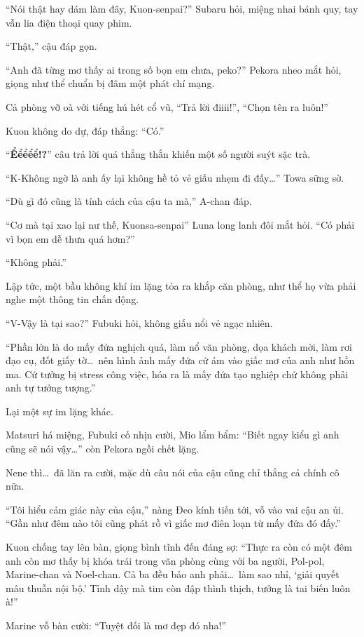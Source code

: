\documentclass[../main.tex]{subfiles}
\begin{document}
``Nói thật hay dám làm đây, Kuon-senpai?'' Subaru hỏi, miệng nhai bánh quy, tay vẫn lia điện thoại quay phim.

``Thật,'' cậu đáp gọn.

``Anh đã từng mơ thấy ai trong số bọn em chưa, peko?'' Pekora nheo mắt hỏi, giọng như thể chuẩn bị đâm một phát chí mạng.

Cả phòng vỡ oà với tiếng hú hét cổ vũ, ``Trả lời điiii!'', ``Chọn tên ra luôn!''

Kuon không do dự, đáp thẳng: ``Có.''

``\textbf{Ểểểểể!?}'' câu trả lời quá thẳng thắn khiến một số người suýt sặc trà.

``K-Không ngờ là anh ấy lại không hề tỏ vẻ giấu nhẹm đi đấy\dots'' Towa sững sờ.

``Dù gì đó cũng là tính cách của cậu ta mà,'' A-chan đáp.

``Cơ mà tại xao lại nư thế, Kuonsa-senpai'' Luna long lanh đôi mắt hỏi. ``Có phải vì bọn em dễ thưn quá hơm?''

``Không phải.''

Lập tức, một bầu không khí im lặng tỏa ra khắp căn phòng, như thể họ vừa phải nghe một thông tin chấn động.

``V-Vậy là tại sao?'' Fubuki hỏi, không giấu nổi vẻ ngạc nhiên.

``Phần lớn là do mấy đứa nghịch quá, làm nổ văn phòng, dọa khách mời, làm rơi đạo cụ, đốt giấy tờ\dots\ nên hình ảnh mấy đứa cứ ám vào giấc mơ của anh như hồn ma. Cứ tưởng bị stress công việc, hóa ra là mấy đứa tạo nghiệp chứ không phải anh tự tưởng tượng.''

Lại một sự im lặng khác.

Matsuri há miệng, Fubuki cố nhịn cười, Mio lẩm bẩm: ``Biết ngay kiểu gì anh cũng sẽ nói vậy\dots'' còn Pekora ngồi chết lặng.

Nene thì\dots\ đã lăn ra cười, mặc dù câu nói của cậu cũng chỉ thẳng cả chính cô nữa.

``Tôi hiểu cảm giác này của cậu,'' nàng Đeo kính tiến tới, vỗ vào vai cậu an ủi. ``Gần như đêm nào tôi cũng phát rồ vì giấc mơ điên loạn từ mấy đứa đó đấy.''

Kuon chống tay lên bàn, giọng bình tĩnh đến đáng sợ: ``Thực ra còn có một đêm anh còn mơ thấy bị khóa trái trong văn phòng cùng với ba người, Pol-pol, Marine-chan và Noel-chan. Cả ba đều bảo anh phải\dots\ làm sao nhỉ, `giải quyết mâu thuẫn nội bộ.' Tỉnh dậy mà tim còn đập thình thịch, tưởng là tai biến luôn à!''

Marine vỗ bàn cười: ``Tuyệt đối là mơ đẹp đó nha!''
\end{document}
